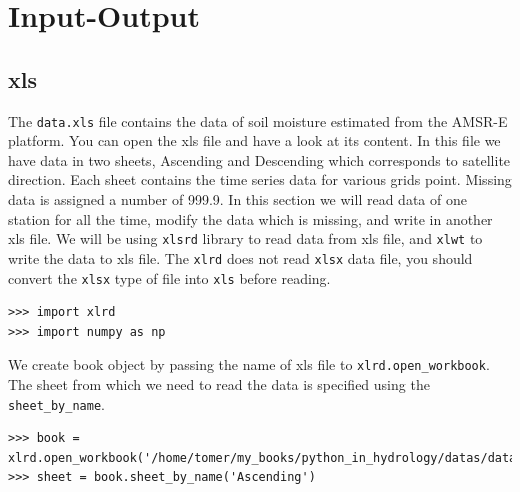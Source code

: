\documentclass[10pt]{book}
\begin{document}
\chapter{Input-Output}
\section{xls}
The \verb"data.xls" file contains the data of soil moisture estimated from the AMSR-E platform. You can open the xls file and have a look at its content. In this file we have data in two sheets, Ascending and Descending which corresponds to satellite direction. Each sheet contains the time series data for various grids point. Missing data is assigned a number of 999.9. In this section we will read data of one station for all the time, modify the data which is missing, and write in another xls file. We will be using \verb"xlsrd" library to read data from xls file, and \verb"xlwt" to write the data to xls file. The \verb"xlrd" does not read \verb"xlsx" data file, you should convert the \verb"xlsx" type of file into \verb"xls" before reading.

\beforeverb \begin{verbatim}
>>> import xlrd
>>> import numpy as np
\end{verbatim} \afterverb

We create book object by passing the name of xls file to \verb"xlrd.open_workbook". The sheet from which we need to read the data is specified using the \verb"sheet_by_name".  
\beforeverb \begin{verbatim}
>>> book = xlrd.open_workbook('/home/tomer/my_books/python_in_hydrology/datas/data.xls')
>>> sheet = book.sheet_by_name('Ascending')
\end{verbatim} \afterverb
\end{document}

